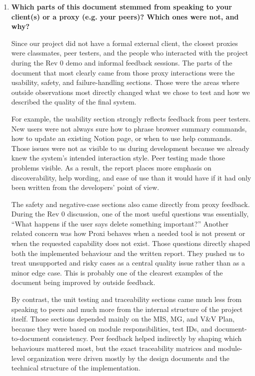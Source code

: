 \documentclass[12pt]{article}
\begin{document}
\begin{enumerate}
\bigskip
\item \textbf{Which parts of this document stemmed from speaking
to your client(s) or a proxy (e.g. your peers)? Which ones were not, and
why?}

Since our project did not have a formal external client, the closest
proxies were classmates, peer testers, and the people who interacted
with the project during the Rev 0 demo and informal feedback sessions.
The parts of the document that most clearly came from those proxy
interactions were the usability, safety, and failure-handling sections.
Those were the areas where outside observations most directly changed
what we chose to test and how we described the quality of the final
system.

For example, the usability section strongly reflects feedback from peer
testers. New users were not always sure how to phrase browser summary
commands, how to update an existing Notion page, or when to use help
commands. Those issues were not as visible to us during development
because we already knew the system's intended interaction style. Peer
testing made those problems visible. As a result, the report places more
emphasis on discoverability, help wording, and ease of use than it would
have if it had only been written from the developers' point of view.

The safety and negative-case sections also came directly from proxy
feedback. During the Rev 0 discussion, one of the most useful questions
was essentially, ``What happens if the user says delete something
important?'' Another related concern was how Proxi behaves when a needed
tool is not present or when the requested capability does not exist.
Those questions directly shaped both the implemented behaviour and the
written report. They pushed us to treat unsupported and risky cases as a
central quality issue rather than as a minor edge case. This is probably
one of the clearest examples of the document being improved by outside
feedback.

By contrast, the unit testing and traceability sections came much less
from speaking to peers and much more from the internal structure of the
project itself. Those sections depended mainly on the MIS, MG, and V\&V
Plan, because they were based on module responsibilities, test IDs, and
document-to-document consistency. Peer feedback helped indirectly by
shaping which behaviours mattered most, but the exact traceability
matrices and module-level organization were driven mostly by the design
documents and the technical structure of the implementation.


\end{enumerate}
\end{document}
